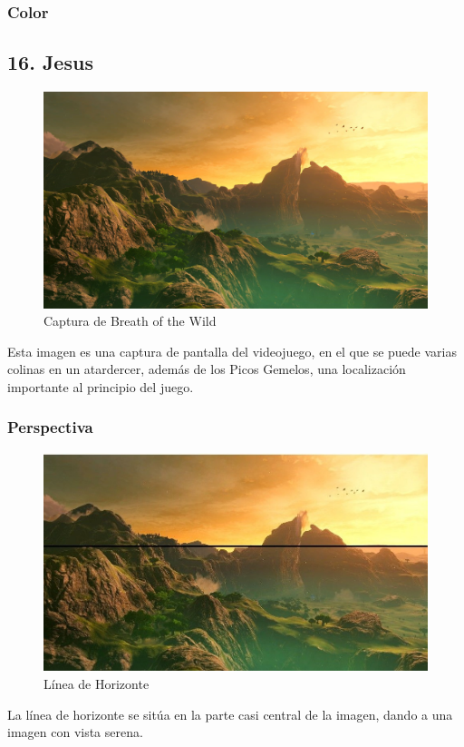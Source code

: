 \documentclass[12pt]{article}
\begin{document}
        \subsubsection{Color}
        \newpage


    \subsection{16. Jesus}
        \begin{figure}[H]
          \centering
          \includegraphics[scale = 0.25]{Jesus/Seccion16/16_concept_art (2).jpg}
          \caption{Captura de Breath of the Wild}
        \end{figure}
        Esta imagen es una captura de pantalla del videojuego, en el que se puede varias colinas en un atardercer, además de los Picos Gemelos, una localización importante al principio del juego.

        \subsubsection{Perspectiva}
          \begin{figure}[H]
            \centering
            \includegraphics[scale = 0.5]{Jesus/Seccion16/Fondo4.JPEG}
            \caption{Línea de Horizonte}
          \end{figure}
          La línea de horizonte se sitúa en la parte casi central de la imagen, dando a una imagen con vista serena.
\end{document}
